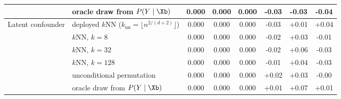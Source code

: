 \begin{tabular}{llcccccc}
                       & oracle draw from $P(Y \mid \Xb)$                     & 0.000 & 0.000 & 0.000 & -0.03 & -0.03 & -0.04 \\
    \midrule
    Latent confounder  & deployed $k$NN ($k_{\mathrm{nn}} = \lfloor n^{2/(d+2)} \rfloor$) & 0.000 & 0.000 & 0.000 & -0.03 & +0.01 & +0.04 \\
                       & $k$NN, $k{=}8$                                       & 0.000 & 0.000 & 0.000 & -0.02 & +0.03 & -0.01 \\
                       & $k$NN, $k{=}32$                                      & 0.000 & 0.000 & 0.000 & -0.02 & +0.06 & -0.03 \\
                       & $k$NN, $k{=}128$                                     & 0.000 & 0.000 & 0.000 & -0.01 & +0.04 & -0.03 \\
                       & unconditional permutation                            & 0.000 & 0.000 & 0.000 & +0.02 & +0.03 & -0.00 \\
                       & oracle draw from $P(Y \mid \Xb)$                     & 0.000 & 0.000 & 0.000 & +0.01 & +0.07 & +0.01 \\
    \bottomrule
\end{tabular}
